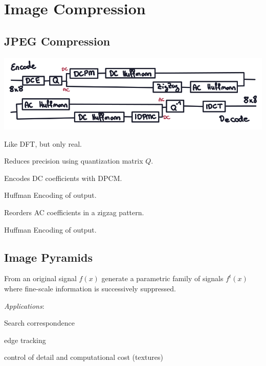 \section{Image Compression}
\subsection{JPEG Compression}

\includegraphics*[width=\linewidth]{assets/jpeg.png}

\begin{definition}
  Like DFT, but only real.
\end{definition}

\begin{definition}[Quantization]
  Reduces precision using  quantization matrix \(Q\).
\end{definition}

\begin{definition}
  Encodes DC coefficients with DPCM.
\end{definition}

\begin{definition}
  Huffman Encoding of output.
\end{definition}

\begin{definition}
  Reorders AC coefficients in a zigzag pattern.
\end{definition}

\begin{definition}
  Huffman Encoding of output.
\end{definition}

\subsection{Image Pyramids}

\begin{definition}
  From an original signal \(f(x)\) generate a parametric family of signals \(f^t(x)\) where fine-scale information is successively suppressed.

  \textit{Applications}:
  \begin{itemize*}
    \item Search correspondence
    \item edge tracking
    \item control of detail and computational cost (textures)
  \end{itemize*}
\end{definition}


